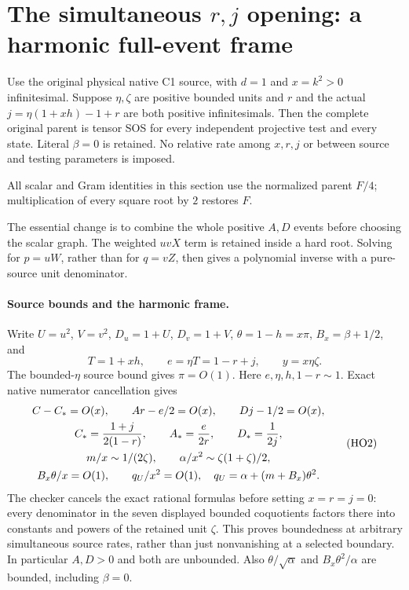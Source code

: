\section{\texorpdfstring{The simultaneous $r,j$ opening: a harmonic full-event frame}{The simultaneous r,j opening: a harmonic full-event frame}}
\label{component:pbf6de1d7328a}

\label{pbf6de1d7328a:sec:r13-c1-simultaneous-rj}

\begin{theorem}
Use the original physical native C1 source, with $d=1$ and $x=k^2>0$
infinitesimal. Suppose $\eta,\zeta$ are positive bounded units and
$r$ and the actual $j=\eta(1+xh)-1+r$ are both positive
infinitesimals. Then the complete original parent is tensor SOS for
every independent projective test and every state. Literal $\beta=0$
is retained. No relative rate among $x,r,j$ or between source and
testing parameters is imposed.
\end{theorem}

All scalar and Gram identities in this section use the normalized
parent $F/4$; multiplication of every square root by $2$ restores $F$.

The essential change is to combine the whole positive $A,D$ events
before choosing the scalar graph. The weighted $uvX$ term is retained
inside a hard root. Solving for $p=uW$, rather than for $q=vZ$,
then gives a polynomial inverse with a pure-source unit denominator.

\paragraph{Source bounds and the harmonic frame.}
Write $U=u^2$, $V=v^2$, $D_u=1+U$, $D_v=1+V$,
$\theta=1-h=x\pi$, $B_x=\beta+1/2$, and
\[
 T=1+xh,\qquad e=\eta T=1-r+j,\qquad y=x\eta\zeta .
 \tag{HO1}
\]
The bounded-$\eta$ source bound gives $\pi=O(1)$.
Here $e,\eta,h,1-r\sim1$. Exact native numerator cancellation gives
\[
 \begin{gathered}
 C-C_* =O(x),\qquad Ar-e/2=O(x),\qquad Dj-1/2=O(x),\\
 C_*={1+j\over2(1-r)},\qquad A_*={e\over2r},\qquad D_*={1\over2j},\\
 m/x\sim1/(2\zeta),\qquad
 \alpha/x^2\sim\zeta(1+\zeta)/2,\\
 B_x\theta/x=O(1),\qquad
 q_U/x^2=O(1),\quad q_U=\alpha+(m+B_x)\theta^2 .
 \end{gathered}
 \tag{HO2}
\]
The checker cancels the exact rational formulas before setting
$x=r=j=0$: every denominator in the seven displayed bounded
coquotients factors there into constants and powers of the retained
unit $\zeta$. This proves boundedness at arbitrary simultaneous
source rates, rather than just nonvanishing at a selected boundary.
In particular $A,D>0$ and both are unbounded.
Also $\theta/\sqrt\alpha$ and $B_x\theta^2/\alpha$ are bounded,
including $\beta=0$.

